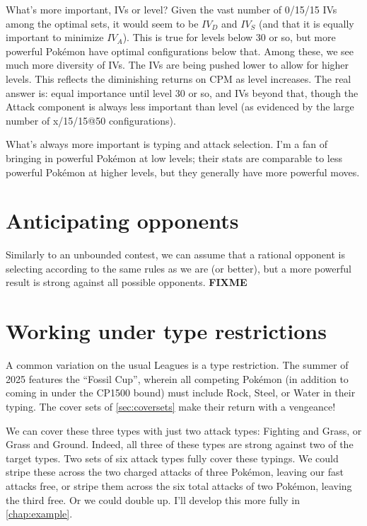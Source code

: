 What's more important, IVs or level?
Given the vast number of 0/15/15 IVs among the optimal sets, it
  would seem to be $IV_D$ and $IV_S$ (and that it is equally
  important to minimize $IV_A$).
This is true for levels below 30 or so, but more powerful Pokémon
  have optimal configurations below that.
Among these, we see much more diversity of IVs.
The IVs are being pushed lower to allow for higher levels.
This reflects the diminishing returns on CPM as level increases.
The real answer is: equal importance until level 30 or so, and IVs beyond that,
  though the Attack component is always less important than level
  (as evidenced by the large number of x/15/15@50 configurations).

What's always more important is typing and attack selection.
I'm a fan of bringing in powerful Pokémon at low levels; their stats are
  comparable to less powerful Pokémon at higher levels, but they
  generally have more powerful moves.

\section{Anticipating opponents}
Similarly to an unbounded contest, we can assume that a rational opponent is selecting
  according to the same rules as we are (or better), but a more powerful result is
  strong against all possible opponents.
\textbf{FIXME}

\section{Working under type restrictions}
\label{sec:typeleagues}
A common variation on the usual Leagues is a type restriction.
The summer of 2025 features the ``Fossil Cup'', wherein all competing
  Pokémon (in addition to coming in under the CP1500 bound)
  must include Rock, Steel, or Water in their typing.
The cover sets of \autoref{sec:coversets} make their return with a vengeance!

We can cover these three types with just two attack types: Fighting and Grass, or Grass and Ground.
Indeed, all three of these types are strong against two of the target types.
Two sets of six attack types fully cover these typings.
We could stripe these across the two charged attacks of three Pokémon,
  leaving our fast attacks free, or stripe them across the six total
  attacks of two Pokémon, leaving the third free.
Or we could double up.
I'll develop this more fully in \autoref{chap:example}.
